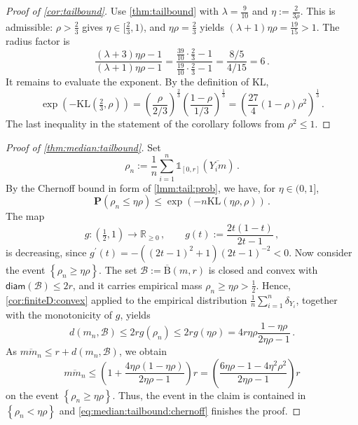 \documentclass{article}
\newcommand*{\mc}[1]{\mathcal{#1}}
\newcommand{\R}{\mathbb{R}}
\newcommand{\Rp}{\R_{\geq0}}
\newcommand{\ball}{\mathrm{B}}
\newcommand{\lcb}{\left\lbrace} %
\newcommand{\rcb}{\right\rbrace} %
\newcommand{\cb}[1]{\lcb #1 \rcb} %
\newcommand{\lb}{\left(} %
\newcommand{\rb}{\right)} %
\newcommand{\br}[1]{\lb #1 \rb} %
\newcommand{\brOf}[1]{\!\br{#1}} %
\renewcommand{\Pr}{\mathbf{P}} %
\newcommand{\PrOf}[1]{\Pr\brOf{#1}}
\newcommand{\pr}{^\prime}
\newcommand{\ind}{\mathds{1}}%
\newcommand{\eqcm}{\,,} %
\newcommand{\eqfs}{\,.}
\newcommand{\kullback}{\mathrm{K\!L}} %
\newcommand{\ol}[2]{\overline{#1#2}}
\newcommand{\diam}{\mathsf{diam}}
\newcommand{\ballclosed}{\overline{\ball}}
\begin{document}
%
\begin{proof}[Proof of \cref{cor:tailbound}]
    Use \cref{thm:tailbound} with $\lambda = \frac9{10}$ and $\eta := \frac{2}{3\rho}$.
    This is admissible: $\rho > \frac23$ gives $\eta \in [\frac23, 1)$, and
    $\eta\rho = \frac23$ yields $(\lambda+1)\eta\rho = \frac{19}{15} > 1$. The radius factor is
    \begin{equation}
        \frac{(\lambda + 3)\eta\rho - 1}{(\lambda + 1)\eta\rho - 1}
        =
        \frac{\frac{39}{10}\cdot\frac23 - 1}{\frac{19}{10}\cdot\frac23 - 1}
        =
        \frac{8/5}{4/15}
        =
        6
        \eqfs
    \end{equation}
    It remains to evaluate the exponent. By the definition of $\kullback$,
    \begin{equation}
        \exp\brOf{-\kullback\brOf{\tfrac23, \rho}}
        =
        \br{\frac{\rho}{2/3}}^{\frac23} \br{\frac{1-\rho}{1/3}}^{\frac13}
        =
        \br{\frac{27}{4} (1-\rho) \rho^2}^{\frac13}
        \eqfs
    \end{equation}
    The last inequality in the statement of the corollary follows from $\rho^2 \leq 1$.
\end{proof}
%
\begin{proof}[Proof of \cref{thm:median:tailbound}]
    Set
    \begin{equation}
        \rho_n := \frac1n \sum_{i=1}^n \ind_{[0,r]}(\ol {Y_i}{m})
        \eqfs
    \end{equation}
    By the Chernoff bound in form of \cref{lmm:tail:prob}, we have, for $\eta\in(0,1]$,
    \begin{equation}\label{eq:median:tailbound:chernoff}
        \PrOf{\rho_n \leq \eta \rho} \leq \exp\brOf{-n \kullback(\eta\rho, \rho)}
        \eqfs
    \end{equation}
    The map
    \begin{equation}
        g \colon \br{\tfrac12, 1} \to \Rp
        \eqcm\qquad
        g(t) := \frac{2t(1-t)}{2t-1}
        \eqcm
    \end{equation}
    is decreasing, since $g\pr(t) = -\br{(2t-1)^2+1}(2t-1)^{-2} < 0$.
    Now consider the event $\cb{\rho_n \geq \eta\rho}$. The set $\mc B := \ballclosed(m, r)$ is closed and convex with $\diam(\mc B) \leq 2r$, and it carries empirical mass $\rho_n \geq \eta\rho > \frac12$. Hence, \cref{cor:finiteD:convex} applied to the empirical distribution $\frac1n\sum_{i=1}^n \delta_{Y_i}$, together with the monotonicity of $g$, yields
    \begin{equation}
        d\brOf{m_n, \mc B} \leq 2r g(\rho_n) \leq 2r g(\eta\rho) = 4 r \eta\rho \frac{1 - \eta\rho}{2\eta\rho - 1}
        \eqfs
    \end{equation}
    As $\ol m{m_n} \leq r + d(m_n, \mc B)$, we obtain
    \begin{equation}
        \ol m{m_n}
        \leq
        \br{1 + \frac{4\eta\rho(1-\eta\rho)}{2\eta\rho-1}} r
        =
        \br{\frac{6\eta\rho - 1 - 4\eta^2\rho^2}{2\eta\rho - 1}} r
    \end{equation}
    on the event $\cb{\rho_n \geq \eta\rho}$. Thus, the event in the claim is contained in $\cb{\rho_n < \eta\rho}$ and \eqref{eq:median:tailbound:chernoff} finishes the proof.
\end{proof}
\end{document}
